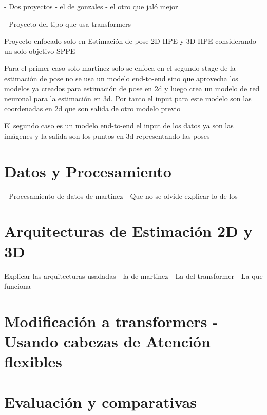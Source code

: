 - Dos proyectos
- el de gonzales
- el otro que jaló mejor

- Proyecto del tipo que usa transformers

Proyecto enfocado solo en Estimación de pose 2D HPE y 3D HPE considerando un solo objetivo SPPE

Para el primer caso solo martinez solo se enfoca en el segundo stage de la estimación de pose
no se usa un modelo end-to-end sino que aprovecha los modelos ya creados para estimación de pose
en 2d y luego crea un modelo de red neuronal para la estimación en 3d. Por tanto el input para este
modelo son las coordenadas en 2d que son salida de otro modelo previo

El segundo caso es un modelo end-to-end el input de los datos ya son las imágenes y la salida
son los puntos en 3d representando las poses


\section{Datos y Procesamiento}

- Procesamiento de datos de martinez
- Que no se olvide explicar lo de los

\section{Arquitecturas de Estimación 2D y 3D}

Explicar las arquitecturas usadadas
- la de martinez
- La del transformer
- La que funciona

\section{Modificación a transformers - Usando cabezas de Atención flexibles}

\section{Evaluación y comparativas}
